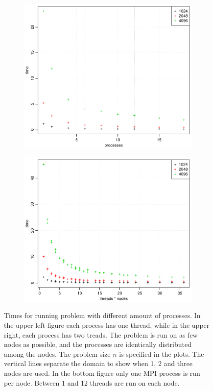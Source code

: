 \begin{figure}[h!]
\begin{subfigure}[b]{0.48\textwidth}
    \includegraphics[width=\textwidth]{./Figures/taskbTimeProc2.pdf}
    \caption{}
    \label{fig:time2}
  \end{subfigure}
  \quad
  \begin{subfigure}[b]{0.48\textwidth}
    \includegraphics[width=\textwidth]{./Figures/taskbTimeNodesTimesThreads.pdf}
    \caption{}
    \label{fig:time3}
  \end{subfigure}
  \vspace{-0.1\baselineskip}
  \caption{Times for running problem with different amount of processes. In the upper left figure each process has one thread, while in the upper right, each process has two treads. The problem is run on as few nodes as possible, and the processes are identically distributed among the nodes. The problem size $n$ is specified in the plots. The vertical lines separate the domain to show when 1, 2 and three nodes are used. In the bottom figure only one MPI process is run per node. Between 1 and 12 threads are run on each node.}
  \label{fig:Times}
\end{figure}
%
\\
